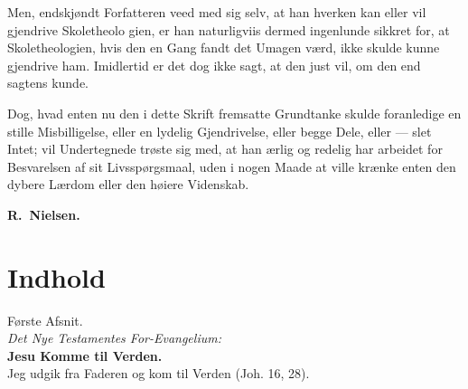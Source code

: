 \documentclass[12pt,a4paper]{book}
\begin{document}
Men, endskjøndt Forfatteren veed med sig selv, at han hverken kan eller vil
gjendrive Skoletheolo\-%
gien, er han naturligviis dermed ingenlunde sikkret for, at Skoletheologien,
hvis den en Gang fandt det Umagen værd, ikke skulde kunne gjendrive ham.
Imidlertid er det dog ikke sagt, at den just vil, om den end sagtens kunde.

Dog, hvad enten nu den i dette Skrift fremsatte Grundtanke skulde foranledige
en stille Misbilligelse, eller en lydelig Gjendrivelse, eller begge Dele,
eller --- slet Intet; vil Undertegnede trøste sig med, at han ærlig og
redelig har arbeidet for Besvarelsen af sit Livsspørgsmaal, uden i nogen
Maade at ville krænke enten den dybere Lærdom eller den høiere Videnskab.

\medskip
\noindent\hspace*{2em}{\small Kjøbenhavn, den 1ste Mai 1849.}

\medskip
\noindent\hfill\textbf{R.\ Nielsen.}\hspace*{3em}

\chapter*{Indhold}
\label{ch:indhold}

\begin{center}
  {\large Første Afsnit.}\\[6pt]
  \emph{Det Nye Testamentes For-Evangelium:}\\[4pt]
  \textbf{\large Jesu Komme til Verden.}\\[6pt]
  {\footnotesize Jeg udgik fra Faderen og kom til Verden (Joh. 16, 28).}
\end{center}
\end{document}

